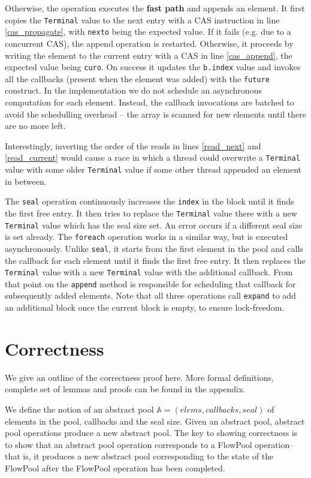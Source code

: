 \documentclass[runningheads,a4paper]{llncs}
\begin{document}
Otherwise, the operation executes the \textbf{fast path} and appends
an element.
It first copies the \verb=Terminal= value to the next entry with a CAS
instruction in line \ref{cas_propagate}, with \verb=nexto= being the
expected value. If it fails (e.g. due to a concurrent CAS), the append
operation is restarted.
Otherwise, it proceeds by writing the element to the current entry with
a CAS in line \ref{cas_append}, the expected value being
\verb=curo=.
On success it updates the \verb=b.index= value and invokes all
the callbacks (present when the element was added) with
the \verb=future= construct.
In the implementation we do not schedule an asynchronous
computation for each element.
Instead, the callback invocations are batched to avoid the schedulling overhead
-- the array is scanned for new elements
until there are no more left.

Interestingly, inverting the order of the reads in lines
\ref{read_next} and \ref{read_current} would cause a race in which a
thread could overwrite a \verb=Terminal= value with some older
\verb=Terminal= value if some other thread appended an element in between.

The \verb=seal= operation continuously increases the \verb=index= in the block
until it finds the first free entry. It then tries to replace the \verb=Terminal=
value there with a new \verb=Terminal= value which has the seal size set.
An error occurs if a different seal size is set already. The \verb=foreach=
operation works in a similar way, but is executed asynchronously. Unlike
\verb=seal=, it starts from the first element in the pool and calls the
callback for each element until it finds the first free entry.
It then replaces the \verb=Terminal= value with a new \verb=Terminal=
value with the additional callback. From that point on the \verb=append=
method is responsible for scheduling that callback for subsequently added elements.
Note that all three operations call \verb=expand= to add an additional
block once the current block is empty, to ensure lock-freedom.



\section{Correctness}

We give an outline of the correctness proof here. More formal
definitions, complete set of lemmas and proofs can be found in the
appendix.

We define the notion of an abstract pool $\mathbb{A} = (elems,
callbacks, seal)$ of elements in the pool, callbacks and the seal
size.
Given an abstract pool, abstract pool operations produce a new
abstract pool.
The key to showing correctness is to show that an abstract pool operation
corresponds to a FlowPool operation-- that is, it produces a
new abstract pool corresponding to the state of the FlowPool after
the FlowPool operation has been completed.
\end{document}
